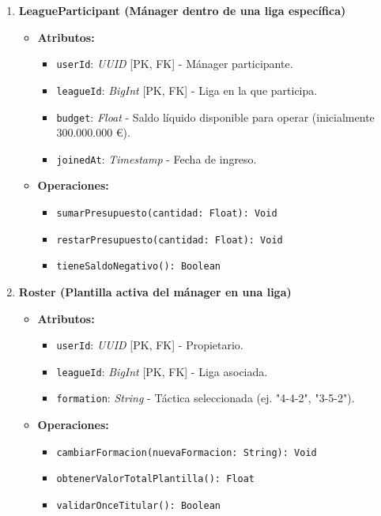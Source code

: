 \begin{enumerate}
    \item \textbf{LeagueParticipant (Mánager dentro de una liga específica)}
    \begin{itemize}
        \item \textbf{Atributos:}
            \begin{itemize}
                \item \texttt{userId}: \textit{UUID} [PK, FK] - Mánager participante.
                \item \texttt{leagueId}: \textit{BigInt} [PK, FK] - Liga en la que participa.
                \item \texttt{budget}: \textit{Float} - Saldo líquido disponible para operar (inicialmente 300.000.000 €).
                \item \texttt{joinedAt}: \textit{Timestamp} - Fecha de ingreso.
            \end{itemize}
        \item \textbf{Operaciones:}
            \begin{itemize}
                \item \texttt{sumarPresupuesto(cantidad: Float): Void}
                \item \texttt{restarPresupuesto(cantidad: Float): Void}
                \item \texttt{tieneSaldoNegativo(): Boolean}
            \end{itemize}
    \end{itemize}

    \item \textbf{Roster (Plantilla activa del mánager en una liga)}
    \begin{itemize}
        \item \textbf{Atributos:}
            \begin{itemize}
                \item \texttt{userId}: \textit{UUID} [PK, FK] - Propietario.
                \item \texttt{leagueId}: \textit{BigInt} [PK, FK] - Liga asociada.
                \item \texttt{formation}: \textit{String} - Táctica seleccionada (ej. "4-4-2", "3-5-2").
            \end{itemize}
        \item \textbf{Operaciones:}
            \begin{itemize}
                \item \texttt{cambiarFormacion(nuevaFormacion: String): Void}
                \item \texttt{obtenerValorTotalPlantilla(): Float}
                \item \texttt{validarOnceTitular(): Boolean}
            \end{itemize}
    \end{itemize}


\end{enumerate}
